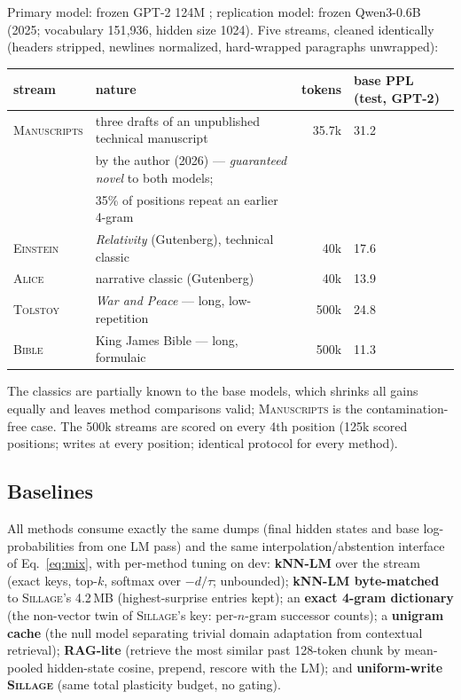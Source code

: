 \documentclass[11pt]{article}
\newcommand{\sillage}{\textsc{Sillage}}
\begin{document}
Primary model: frozen GPT-2 124M \cite{gpt2}; replication model: frozen Qwen3-0.6B (2025; vocabulary 151{,}936, hidden size 1024). Five streams, cleaned identically (headers stripped, newlines normalized, hard-wrapped paragraphs unwrapped):

\begin{center}\small
\begin{tabular}{@{}llrl@{}}
\toprule
stream & nature & tokens & base PPL (test, GPT-2)\\
\midrule
\textsc{Manuscripts} & three drafts of an unpublished technical manuscript & 35.7k & 31.2\\
& by the author (2026) --- \emph{guaranteed novel} to both models; & & \\
& 35\% of positions repeat an earlier 4-gram & & \\
\textsc{Einstein} & \emph{Relativity} (Gutenberg), technical classic & 40k & 17.6\\
\textsc{Alice} & narrative classic (Gutenberg) & 40k & 13.9\\
\textsc{Tolstoy} & \emph{War and Peace} --- long, low-repetition & 500k & 24.8\\
\textsc{Bible} & King James Bible --- long, formulaic & 500k & 11.3\\
\bottomrule
\end{tabular}
\end{center}

The classics are partially known to the base models, which shrinks all gains equally and leaves method comparisons valid; \textsc{Manuscripts} is the contamination-free case. The 500k streams are scored on every 4th position (125k scored positions; writes at every position; identical protocol for every method).

\subsection{Baselines}

All methods consume exactly the same dumps (final hidden states and base log-probabilities from one LM pass) and the same interpolation/abstention interface of Eq.~\eqref{eq:mix}, with per-method tuning on dev: \textbf{kNN-LM} \cite{khandelwal2020} over the stream (exact keys, top-$k$, softmax over $-d/\tau$; unbounded); \textbf{kNN-LM byte-matched} to \sillage's 4.2\,MB (highest-surprise entries kept); an \textbf{exact 4-gram dictionary} (the non-vector twin of \sillage's key: per-$n$-gram successor counts); a \textbf{unigram cache} (the null model separating trivial domain adaptation from contextual retrieval); \textbf{RAG-lite} (retrieve the most similar past 128-token chunk by mean-pooled hidden-state cosine, prepend, rescore with the LM); and \textbf{uniform-write \sillage} (same total plasticity budget, no gating).
\end{document}
